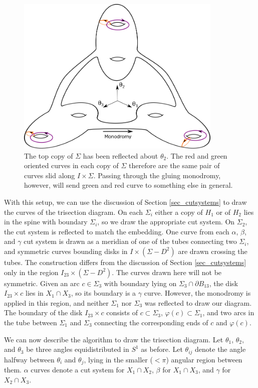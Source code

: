 \documentclass[12pt]{amsart}
\newcommand{\del}{\partial }
\theoremstyle{definition}
\theoremstyle{remark}
\begin{document}
\begin{figure}[h]
\centering
\includegraphics[height=3in]{sigmas.png}
\caption{  The top copy of $\Sigma$ has been reflected about $\theta_2$.  The red and green oriented curves in each copy of $\Sigma$ therefore are the same pair of curves slid along $I \times \Sigma$.  Passing through the gluing monodromy, however, will send green and red curve to something else in general.}
\label{embeddingsigmas}
\end{figure}

With this setup, we can use the discussion of Section \ref{sec_cutsystems} to draw the curves of the trisection diagram.  On each $\Sigma_i$ either a copy of $H_1$ or of $H_2$ lies in the spine with boundary $\Sigma_i$, so we draw the appropriate cut system.  On $\Sigma_2$, the cut system is reflected to match the embedding.  One curve from each $\alpha$, $\beta$, and $\gamma$ cut system is drawn as a meridian of one of the tubes connecting two $\Sigma_i$, and symmetric curves bounding disks in $I \times (\Sigma - D^2)$ are drawn crossing the tubes.  The construction differs from the discussion of Section \ref{sec_cutsystems} only in the region $I_{23} \times (\Sigma - D^2)$.  The curves drawn here will not be symmetric.  Given an arc $c \in \Sigma_3$ with boundary lying on $\Sigma_3 \cap \del B_{13}$, the disk $I_{23} \times c$ lies in $X_1 \cap X_3$, so its boundary is a $\gamma$ curve.  However, the monodromy is applied in this region, and neither $\Sigma_1$ nor $\Sigma_3$ was reflected to draw our diagram.  The boundary of the disk $I_{23} \times c$ consists of $c \subset \Sigma_3$, $\varphi(c) \subset \Sigma_1$, and two arcs in the tube between $\Sigma_1$ and $\Sigma_3$ connecting the corresponding ends of $c$ and $\varphi(c)$.  

We can now describe the algorithm to draw the trisection diagram.  Let $\theta_1$, $\theta_2$, and $\theta_3$ be three angles equidistributed in $S^1$ as before.  Let $\theta_{ij}$ denote the angle halfway between $\theta_i$ and $\theta_j$, lying in the smaller ($<\pi$) angular region between them.  $\alpha$ curves denote a cut system for $X_1 \cap X_2$, $\beta$ for $X_1 \cap X_3$, and $\gamma$ for $X_2 \cap X_3$.
\end{document}
